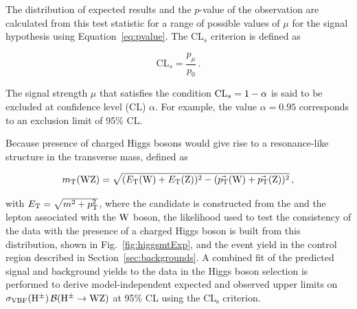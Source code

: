 The distribution of expected results and the 
$p$-value of the observation are calculated from this test statistic for a 
range of possible values of $\mu$ for the signal hypothesis using
Equation~\ref{eq:pvalue}. The CL$_{s}$ criterion is defined as

\begin{equation}
  \mathrm{CL}_{s} = \frac{p_{\mu}}{p_{0}} \,.
\end{equation}

The signal strength $\mu$ that satisfies the condition
${\rm CL}_{s} = 1 - \alpha$ is said to be excluded at 
confidence level (CL) $\alpha$. For example, the value $\alpha=0.95$ corresponds
to an exclusion limit of 95\% CL.

Because presence of charged Higgs bosons would give rise to a resonance-like structure in the 
\WZ transverse mass, defined as

\begin{equation}
  m_{\mathrm{T}}(\mathrm{W}\mathrm{Z}) = \sqrt{(E_{\mathrm{T}}(\mathrm{W}) + E_{\mathrm{T}}(\mathrm{Z}))^2 - (\vec{p_{\mathrm{T}}}(\mathrm{W}) + \vec{p_{\mathrm{T}}}(\mathrm{Z}))^2} \, ,
  \label{eq:wztransmass}
\end{equation}

with $E_{\mathrm{T}} = \sqrt{m^2 + p_{\mathrm{T}}^2}$,
where the \W candidate is constructed from 
the \ptvecmiss 
and the lepton associated with the $\mathrm{W}$ boson,
the likelihood used to test the consistency of the data with the presence of a charged Higgs
boson is built from this distribution, shown in Fig.~\ref{fig:higgsmtExp}, 
and the event yield in the
control region described in Section~\ref{sec:backgrounds}.
A combined fit of the predicted signal and background yields to the data 
in the Higgs boson selection is performed 
to derive model-independent expected and observed upper limits on $\sigma_\mathrm{VBF}(\mathrm{H}^{\pm}) \, 
\mathcal{B}(\mathrm{H}^{\pm}\to \mathrm{W}\mathrm{Z})$ at 95\% CL using the CL$\mathrm{_s}$ criterion. 

